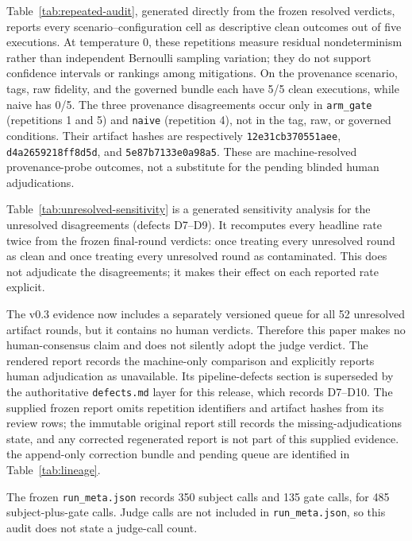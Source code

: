\documentclass[11pt]{article}
\begin{document}
Table~\ref{tab:repeated-audit}, generated directly from the frozen resolved
verdicts, reports every scenario--configuration cell as descriptive clean
outcomes out of five executions. At temperature 0, these repetitions measure
residual nondeterminism rather than independent Bernoulli sampling variation;
they do not support confidence intervals or rankings among mitigations. On the
provenance scenario, tags, raw fidelity, and the governed bundle each have 5/5
clean executions, while naive has 0/5. The three provenance
disagreements occur only in \texttt{arm\_gate} (repetitions 1 and 5) and
\texttt{naive} (repetition 4), not in the tag, raw, or governed conditions.
Their artifact hashes are respectively \texttt{12e31cb370551aee},
\texttt{d4a2659218ff8d5d}, and \texttt{5e87b7133e0a98a5}.
These are machine-resolved provenance-probe outcomes, not a substitute for
the pending blinded human adjudications.



Table~\ref{tab:unresolved-sensitivity} is a generated sensitivity analysis for
the unresolved disagreements (defects D7--D9). It recomputes every headline
rate twice from the frozen final-round verdicts: once treating every unresolved
round as clean and once treating every unresolved round as contaminated. This
does not adjudicate the disagreements; it makes their effect on each reported
rate explicit.



The v0.3 evidence now includes a separately versioned queue for all 52
unresolved artifact rounds, but it contains no human verdicts. Therefore this
paper makes no human-consensus claim and does not silently adopt the judge
verdict. The rendered report records the machine-only comparison and explicitly
reports human adjudication as unavailable. Its pipeline-defects section is
superseded by the authoritative \texttt{defects.md} layer for this release,
which records D7--D10. The supplied frozen report omits repetition identifiers and
artifact hashes from its review rows; the immutable original report still
records the missing-adjudications state, and any corrected regenerated report
is not part of this supplied evidence.
the append-only correction bundle and pending queue are identified in
Table~\ref{tab:lineage}.

The frozen \texttt{run\_meta.json} records 350 subject calls and 135 gate
calls, for 485 subject-plus-gate calls. Judge calls are not included in
\texttt{run\_meta.json}, so this audit does not state a judge-call count.
\end{document}
